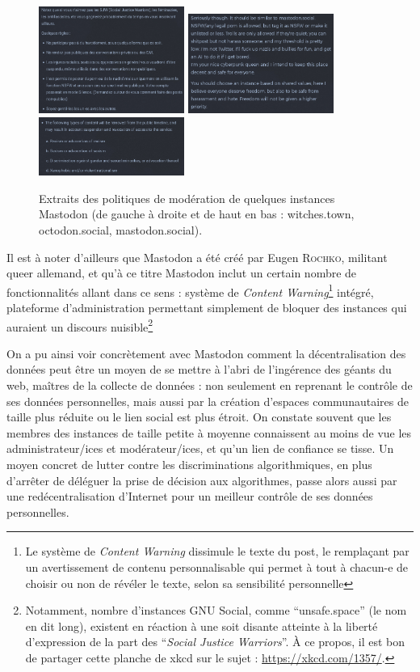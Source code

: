 \documentclass[a4paper,12pt]{report}
\begin{document}
\begin{figure}[ht]
 \begin{center}
  \includegraphics[width=180px]{witches.png}
  \includegraphics[width=180px]{octodon.png}
  \includegraphics[width=180px]{mastodon.png}
 \end{center}
 \caption{Extraits des politiques de modération de quelques instances Mastodon (de gauche à droite et de haut en bas : witches.town, octodon.social, mastodon.social).}
 \label{masto-love}
\end{figure}

Il est à noter d'ailleurs que Mastodon a été créé par Eugen \textsc{Rochko}, militant queer allemand, et qu'à ce titre Mastodon inclut un certain nombre de fonctionnalités allant dans ce sens : système de \textit{Content Warning}\footnote{Le système de \textit{Content Warning} dissimule le texte du post, le remplaçant par un avertissement de contenu personnalisable qui permet à tout à chacun-e de choisir ou non de révéler le texte, selon sa sensibilité personnelle} intégré, plateforme d'administration permettant simplement de bloquer des instances qui auraient un discours nuisible\footnote{Notamment, nombre d'instances GNU Social, comme ``unsafe.space'' (le nom en dit long), existent en réaction à une soit disante atteinte à la liberté d'expression de la part des ``\textit{Social Justice Warriors}''. À ce propos, il est bon de partager cette planche de xkcd sur le sujet : \url{https://xkcd.com/1357/}.}

On a pu ainsi voir concrètement avec Mastodon comment la décentralisation des données peut être un moyen de se mettre à l'abri de l'ingérence des géants du web, maîtres de la collecte de données : non seulement en reprenant le contrôle de ses données personnelles, mais aussi par la création d'espaces communautaires de taille plus réduite ou le lien social est plus étroit. On constate souvent que les membres des instances de taille petite à moyenne connaissent au moins de vue les administrateur/ices et modérateur/ices, et qu'un lien de confiance se tisse. Un moyen concret de lutter contre les discriminations algorithmiques, en plus d'arrêter de déléguer la prise de décision aux algorithmes, passe alors aussi par une redécentralisation d'Internet pour un meilleur contrôle de ses données personnelles.
\end{document}
